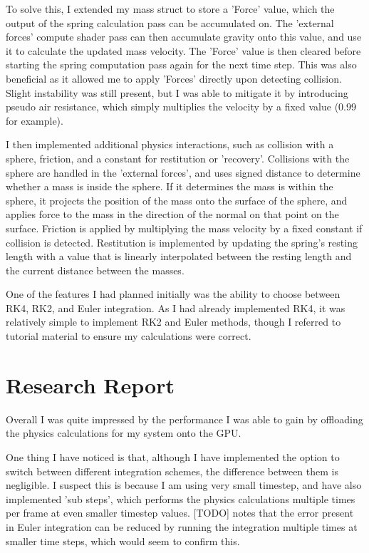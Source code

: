 \documentclass[]{acmsiggraph}
\begin{document}
To solve this, I extended my mass struct to store a 'Force' value, which the output of the spring calculation pass can be accumulated on. The 'external forces' compute shader pass can then accumulate gravity onto this value, and use it to calculate the updated mass velocity. The 'Force' value is then cleared before starting the spring computation pass again for the next time step. This was also beneficial as it allowed me to apply 'Forces' directly upon detecting collision. Slight instability was still present, but I was able to mitigate it by introducing pseudo air resistance, which simply multiplies the velocity by a fixed value (0.99 for example).

I then implemented additional physics interactions, such as collision with a sphere, friction, and a constant for restitution or 'recovery'. Collisions with the sphere are handled in the 'external forces', and uses signed distance to determine whether a mass is inside the sphere. If it determines the mass is within the sphere, it projects the position of the mass onto the surface of the sphere, and applies force to the mass in the direction of the normal on that point on the surface. Friction is applied by multiplying the mass velocity by a fixed constant if collision is detected. Restitution is implemented by updating the spring's resting length with a value that is linearly interpolated between the resting length and the current distance between the masses.

One of the features I had planned initially was the ability to choose between RK4, RK2, and Euler integration. As I had already implemented RK4, it was relatively simple to implement RK2 and Euler methods, though I referred to tutorial material \cite{TODO} to ensure my calculations were correct.

\section{Research Report} \label{sec:report}

Overall I was quite impressed by the performance I was able to gain by offloading the physics calculations for my system onto the GPU.

One thing I have noticed is that, although I have implemented the option to switch between different integration schemes, the difference between them is negligible. I suspect this is because I am using very small timestep, and have also implemented 'sub steps', which performs the physics calculations multiple times per frame at even smaller timestep values.
[TODO] notes that the error present in Euler integration can be reduced by running the integration multiple times at smaller time steps, which would seem to confirm this.
\end{document}
